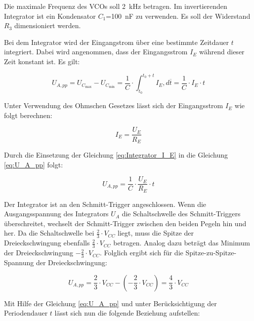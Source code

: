 Die maximale Frequenz des VCOs soll \SI{2}{\kilo\hertz} betragen. Im invertierenden Integrator ist ein Kondensator $C_1$=\SI{100}{\nano\farad} zu verwenden. Es soll der Widerstand $R_3$ dimensioniert werden.
 
Bei dem Integrator wird der Eingangstrom über eine bestimmte Zeitdauer $t$ integriert. Dabei wird angenommen, dass der Eingangsstrom $I_E$ während dieser Zeit konstant ist. Es gilt:

\begin{equation}
\label{eq:U_A_pp}
U_{A,pp} = U_{C_{\max{}}}-U_{C_{\min{}}}=\frac{1}{C} \cdot \int_{t_0}^{t_0+t} I_E , d\overline{t} = \frac{1}{C} \cdot I_E \cdot t
\end{equation}


Unter Verwendung des Ohmschen Gesetzes lässt sich der Eingangsstrom $I_E$ wie folgt berechnen:

\begin{equation}
\label{eq:Integrator_I_E}
    I_E=\frac{U_E}{R_E}
\end{equation}

Durch die Einsetzung der Gleichung \ref{eq:Integrator_I_E} in die Gleichung \ref{eq:U_A_pp} folgt:

\begin{equation*}
    U_{A,pp}=\frac{1}{C}\cdot \frac{U_E}{R_E} \cdot t
\end{equation*}

Der Integrator ist an den Schmitt-Trigger angeschlossen. Wenn die Ausgangsspannung des Integrators $U_A$ die Schaltschwelle des Schmitt-Triggers überschreitet, wechselt der Schmitt-Trigger zwischen den beiden Pegeln hin und her. Da die Schaltschwelle bei $\frac{2}{3} \cdot V_{CC}$ liegt, muss die Spitze der Dreieckschwingung ebenfalls $\frac{2}{3} \cdot V_{CC}$ betragen. Analog dazu beträgt das Minimum der Dreieckschwingung $-\frac{2}{3} \cdot V_{CC}$. Folglich ergibt sich für die Spitze-zu-Spitze-Spannung der Dreieckschwingung:

\begin{equation*}
U_{A,pp} =\frac{2}{3} \cdot V_{CC}-(-\frac{2}{3} \cdot V_{CC})=\frac{4}{3} \cdot V_{CC}
\end{equation*}

Mit Hilfe der Gleichung \ref{eq:U_A_pp} und unter Berücksichtigung der Periodendauer $t$ lässt sich nun die folgende Beziehung aufstellen:
    
